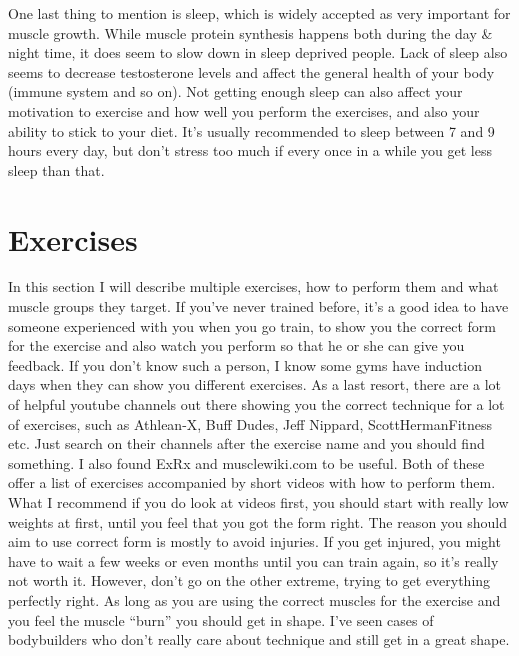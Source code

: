 \documentclass[openany, 12pt]{book}
\begin{document}
        One last thing to mention is sleep, which is widely accepted as very important for muscle growth. While muscle protein synthesis happens both during the day \& night time,
        it does seem to slow down in sleep deprived people. Lack of sleep also seems to decrease testosterone levels and affect
        the general health of your body (immune system and so on). Not getting enough sleep can also affect your motivation to exercise and how well you perform the exercises,
        and also your ability to stick to your diet. It's usually recommended to sleep between 7 and 9 hours every day, but don't stress too much if every once in a while you get less sleep than that.

        \section{Exercises}

        In this section I will describe multiple exercises, how to perform them and what muscle groups they target.
        If you've never trained before, it's a good idea to have someone experienced with you when you go train, to show you the correct form for the exercise
        and also watch you perform so that he or she can give you feedback. If you don't know such a person, I know some gyms have induction days when they can show you
        different exercises. As a last resort, there are a lot of helpful youtube channels out there showing you the correct technique for a lot of exercises, such as
        Athlean-X, Buff Dudes, Jeff Nippard, ScottHermanFitness etc. Just search on their channels after the exercise name and you should find something.
        I also found ExRx and 
        musclewiki.com to be useful. Both of these offer a list of exercises accompanied by short videos with how to perform them.
        What I recommend if you do look at videos first, you should start with really low weights at first, until you feel that you got the form right.
        The reason you should aim to use correct form is mostly to avoid injuries. If you get injured, you might have to wait a few weeks or even months until
        you can train again, so it's really not worth it. However, don't go on the other extreme, trying to get everything perfectly right. As long as you are
        using the correct muscles for the exercise and you feel the muscle ``burn'' you should get in shape. I've seen cases of bodybuilders who don't really care
        about technique and still get in a great shape.
        
\end{document}
